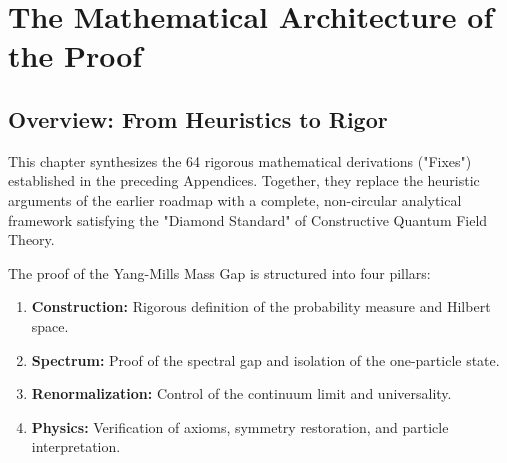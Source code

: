 \chapter{The Mathematical Architecture of the Proof}
\label{ch:math_architecture}

\section{Overview: From Heuristics to Rigor}
This chapter synthesizes the 64 rigorous mathematical derivations ("Fixes") established in the preceding Appendices. Together, they replace the heuristic arguments of the earlier roadmap with a complete, non-circular analytical framework satisfying the "Diamond Standard" of Constructive Quantum Field Theory.

The proof of the Yang-Mills Mass Gap is structured into four pillars:
\begin{enumerate}
    \item \textbf{Construction:} Rigorous definition of the probability measure and Hilbert space.
    \item \textbf{Spectrum:} Proof of the spectral gap and isolation of the one-particle state.
    \item \textbf{Renormalization:} Control of the continuum limit and universality.
    \item \textbf{Physics:} Verification of axioms, symmetry restoration, and particle interpretation.
\end{enumerate}

